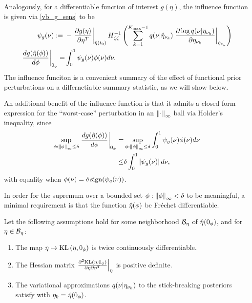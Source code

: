 %
Analogously, for a differentiable function of interest $g(\eta)$,
the influence function is given via \eqref{vb_g_sens} to be
%
\begin{align*}
%
\inflg(\nu) :={}&
-\fracat{\partial g(\eta)}{\partial \eta^T}{\etaopt(\t_0)}
    \hess{\zeta\zeta}^{-1}
\left(
    \sumkm
    \q(\nu \vert \etaoptnuk)
    \fracat{\partial \log\q(\nu \vert \etanuk)}
           {\partial \etanuk}
           {\etaoptnuk}
\right) \\
\fracat{d g(\etaopt(\phi))}{d \phi}{\phiz} =&{}
    \int_0^1 \inflg(\nu) \phi(\nu) d\nu.
%
\end{align*}
%
The influence funciton is a convenient summary of the effect of functional prior
perturbations on a differnetiable summary statistic, as we will show below.

An additional benefit of the influence function is that it admits a closed-form
expression for the ``worst-case'' perturbation in an $\left\Vert\cdot\right\Vert_{\infty}$ ball
via Holder's inequality, since
%
\begin{align*}
%
\sup_{\phi: \norminf{\phi} \le \delta}
    \fracat{d g(\etaopt(\phi))}{d \phi}{\phiz} =&{}
\sup_{\phi: \norminf{\phi} \le \delta}
    \int_0^1 \inflg(\nu) \phi(\nu) d\nu \\
\le&{} \delta \int_0^1 \abs{\inflg(\nu) }d\nu,
%
\end{align*}
%
with equality when $\phi(\nu) = \delta \, \mathrm{sign}(\psi_{g}(\nu))$.

In order for the supremum over a bounded set $\phi: \left\Vert\phi\right\Vert_{\infty} < \delta$
to be meaningful, a minimal requirement is that the function $\hat\eta(\phi)$
be Fr{\'e}chet differentiable.

\begin{assu}
%
Let the following assumptions hold for some neighborhood $\mathcal{B}_\eta$
of $\hat\eta(0_\phi)$, and for $\eta \in \mathcal{B}_\eta$:
%
\begin{enumerate}
%
    \item {}
    The map $\eta \mapsto \mathrm{KL}\left(\eta, 0_\phi\right)$ is twice
    continuously differentiable.
%
\item{}
    The Hessian matrix $\left.\frac{\partial^2 \mathrm{KL}\left(\eta, 0_\phi\right)}{\partial \eta \partial \eta^T}\right\vert_{\eta}$ is positive definite.%
\item{} The variational approximations $q(\nu
\vert \eta_{\nu_{k}})$ to the stick-breaking posteriors satisfy 
with $\eta_0 = \hat\eta(0_\phi)$.
%
\end{enumerate}
%
\end{assu}

